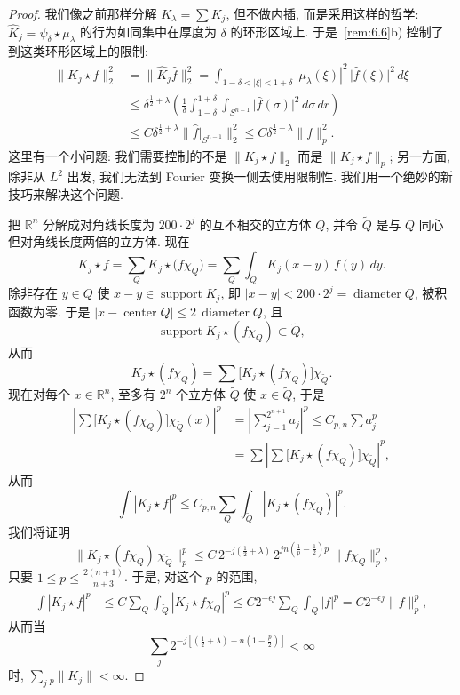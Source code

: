 \begin{proof}
我们像之前那样分解 $K_{\lambda}=\sum K_j$, 但不做内插, 而是采用这样的哲学: $\hat{K}_j=\psi_\delta\star\mu_\lambda$ 的行为如同集中在厚度为 $\delta$ 的环形区域上. 于是~\ref*{rem:6.6}b) 控制了到这类环形区域上的限制:
\begin{align*}
\|K_{j}\star f\|_{2}^{2}&=\|\hat{K}_{j}\hat{f}\|_{2}^{2}
=\int_{1-\delta<|\xi|<1+\delta}|\mu_{\lambda}(\xi)|^{2}\,\bigl|\hat{f}(\xi)\bigr|^{2}\,d\xi \\
&\leq\delta^{\frac{1}{2}+\lambda}\left(\frac{1}{\delta}\int_{1-\delta}^{1+\delta}\int_{S^{n-1}}\bigl|\hat{f}(\sigma)\bigr|^{2}\,d\sigma\,dr\right) \\
&\leq C\delta^{\frac{1}{2}+\lambda}\bigl\|\hat{f}|_{S^{n-1}}\bigr\|_{2}^{2}
\leq C\delta^{\frac{1}{2}+\lambda}\|f\|_{p}^{2}.
\end{align*}
这里有一个小问题: 我们需要控制的不是 $\|K_j\star f\|_2$ 而是 $\|K_j\star f\|_p$; 另一方面, 除非从 $L^2$ 出发, 我们无法到 Fourier 变换一侧去使用限制性. 我们用一个绝妙的新技巧来解决这个问题.

把 $\mathbb{R}^n$ 分解成对角线长度为 $200\cdot 2^j$ 的互不相交的立方体 $Q$, 并令 $\tilde{Q}$ 是与 $Q$ 同心但对角线长度两倍的立方体. 现在
\[
K_{j}\star f=\sum_{Q}K_{j}\star\bigl(f\chi_{Q}\bigr)
=\sum_{Q}\int_{Q}K_{j}(x-y)\,f(y)\,dy.
\]
除非存在 $y\in Q$ 使 $x-y\in\operatorname{support}K_j$, 即 $|x-y|<200\cdot 2^j=\operatorname{diameter}Q$, 被积函数为零. 于是 $|x-\operatorname{center}Q|\leq 2\,\operatorname{diameter}Q$, 且
\[
\operatorname{support}K_{j}\star(f\chi_{Q})\subset\tilde{Q},
\]
从而
\[
K_{j}\star(f\chi_{Q})=\sum\bigl[K_{j}\star(f\chi_{Q})\bigr]\chi_{\tilde{Q}}.
\]
现在对每个 $x\in\mathbb{R}^n$, 至多有 $2^n$ 个立方体 $\tilde{Q}$ 使 $x\in\tilde{Q}$, 于是
\begin{align*}
\left|\sum\bigl[K_{j}\star(f\chi_{Q})\bigr]\chi_{\tilde{Q}}(x)\right|^{p}
&=\left|\sum_{j=1}^{2^{n+1}}a_{j}\right|^{p}\leq C_{p,n}\sum a_{j}^{p} \\
&=\sum\left|\sum\bigl[K_{j}\star(f\chi_{Q})\bigr]\chi_{\tilde{Q}}\right|^{p},
\end{align*}
从而
\[
\int|K_{j}\star f|^{p}\leq C_{p,n}\sum_{Q}\int_{\tilde{Q}}|K_{j}\star(f\chi_{Q})|^{p}.
\]
我们将证明
\[
\bigl\|K_{j}\star(f\chi_{Q})\,\chi_{\tilde{Q}}\bigr\|_{p}^{p}
\leq C\,2^{-j(\frac{1}{2}+\lambda)}\,2^{jn(\frac{1}{p}-\frac{1}{2})p}\,\|f\chi_{Q}\|_{p}^{p},
\]
只要 $1\leq p\leq\frac{2(n+1)}{n+3}$. 于是, 对这个 $p$ 的范围,
\begin{align*}
\int|K_{j}\star f|^{p}
&\leq C\sum_{Q}\int_{\tilde{Q}}|K_{j}\star f\chi_{Q}|^{p}
\leq C2^{-\epsilon j}\sum_{Q}\int_{Q}|f|^{p}
=C2^{-\epsilon j}\|f\|_{p}^{p},
\end{align*}
从而当
\[
\sum_{j}2^{-j\left[\left(\frac{1}{2}+\lambda\right)-n\left(1-\frac{p}{2}\right)\right]}<\infty
\]
时, $\sum_j{}_p\|K_j\|<\infty$.


\end{proof}
